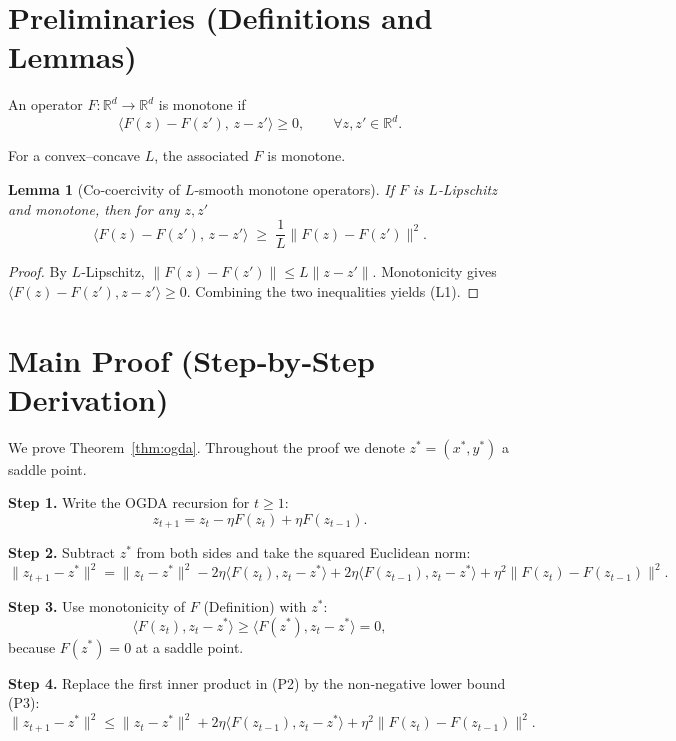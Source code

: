 \documentclass{article}
\newtheorem{lemma}{Lemma}
\begin{document}
\newpage
\section*{Preliminaries (Definitions and Lemmas)}
\begin{definition}
An operator $F:\mathbb R^{d}\to\mathbb R^{d}$ is monotone if
\[
\langle F(z)-F(z'),\,z-z'\rangle\ge 0,\qquad\forall z,z'\in\mathbb R^{d}.
\]
\end{definition}
For a convex–concave $L$, the associated $F$ is monotone.

\begin{lemma}[Co‑coercivity of $L$‑smooth monotone operators]\label{lem:coerc}
If $F$ is $L$‑Lipschitz and monotone, then for any $z,z'$
\[
\langle F(z)-F(z'),\,z-z'\rangle \;\ge\; \frac{1}{L}\|F(z)-F(z')\|^{2}.
\tag{L1}
\]
\end{lemma}
\begin{proof}
By $L$‑Lipschitz, $\|F(z)-F(z')\|\le L\|z-z'\|$. Monotonicity gives $\langle F(z)-F(z'),z-z'\rangle\ge0$. Combining the two inequalities yields (L1). \hfill\qedsymbol
\end{proof}

\section*{Main Proof (Step‑by‑Step Derivation)}
We prove Theorem~\ref{thm:ogda}. Throughout the proof we denote $z^{*}=(x^{*},y^{*})$ a saddle point.

\noindent\textbf{Step 1.}  Write the OGDA recursion for $t\ge1$:
\[
z_{t+1}=z_{t}-\eta F(z_{t})+\eta F(z_{t-1}).
\tag{P1}
\]

\noindent\textbf{Step 2.}  Subtract $z^{*}$ from both sides and take the squared Euclidean norm:
\[
\|z_{t+1}-z^{*}\|^{2}
= \|z_{t}-z^{*}\|^{2}
-2\eta\langle F(z_{t}),z_{t}-z^{*}\rangle
+2\eta\langle F(z_{t-1}),z_{t}-z^{*}\rangle
+\eta^{2}\|F(z_{t})-F(z_{t-1})\|^{2}.
\tag{P2}
\]

\noindent\textbf{Step 3.}  Use monotonicity of $F$ (Definition) with $z^{*}$:
\[
\langle F(z_{t}),z_{t}-z^{*}\rangle\ge
\langle F(z^{*}),z_{t}-z^{*}\rangle=0,
\tag{P3}
\]
because $F(z^{*})=0$ at a saddle point.

\noindent\textbf{Step 4.}  Replace the first inner product in (P2) by the non‑negative lower bound (P3):
\[
\|z_{t+1}-z^{*}\|^{2}
\le \|z_{t}-z^{*}\|^{2}
+2\eta\langle F(z_{t-1}),z_{t}-z^{*}\rangle
+\eta^{2}\|F(z_{t})-F(z_{t-1})\|^{2}.
\tag{P4}
\]
\end{document}
